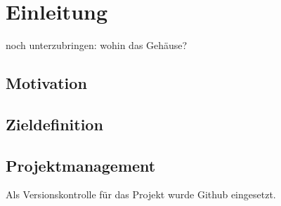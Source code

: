 
\chapter{Einleitung}
\label{sec:Einleitung}
\pagestyle{scrheadings}



noch unterzubringen:
wohin das Gehäuse?
\section{Motivation}

\section{Zieldefinition}

\section{Projektmanagement}
Als Versionskontrolle für das Projekt wurde Github eingesetzt.